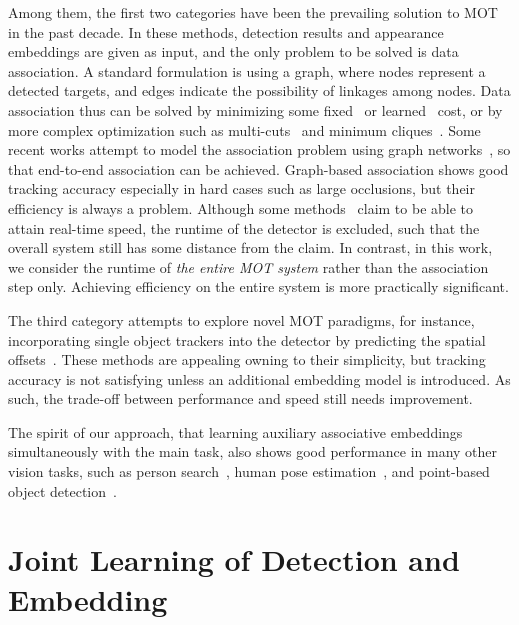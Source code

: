 \documentclass[runningheads]{llncs}
\begin{document}
Among them, the first two categories have been the prevailing solution to MOT in the past decade. In these methods, detection results and appearance embeddings are given as input, and the only problem to be solved is data association. A standard formulation is using a graph, where nodes represent a detected targets, and edges indicate the possibility of linkages among nodes. Data association thus can be solved by minimizing some fixed~\cite{mot1,mot2,mot3} or learned~\cite{mot4} cost, or by more complex optimization such as multi-cuts~\cite{multicut} and minimum cliques~\cite{mot5}. Some 
recent works attempt to model the association problem using graph networks~\cite{gnnmot1,gnnmot2}, so that end-to-end association can be achieved. Graph-based association shows good tracking accuracy especially in hard cases such as large occlusions, but their efficiency is always a problem.  Although some methods~\cite{nomt} claim to be able to attain real-time speed, the runtime of the detector is excluded, such that the overall system still has some distance from the claim. In contrast, in this work, we consider the runtime of \emph{the entire MOT system} rather than the association step only. Achieving efficiency on the entire system is more practically significant. 

The third category attempts to explore novel MOT paradigms, for instance, incorporating single object trackers into the detector by predicting the spatial offsets~\cite{tracktor}. These methods are appealing owning to their simplicity, but tracking accuracy is not satisfying unless an additional embedding model is introduced. As such, the trade-off between performance and speed still needs improvement.

 The spirit of our approach, that learning auxiliary associative embeddings simultaneously with the main task, also shows good performance in many other vision tasks, such as person search~\cite{personsearch}, human pose estimation~\cite{ae}, and point-based object detection~\cite{cornernet}.






\section{Joint Learning of Detection and Embedding}
\end{document}
